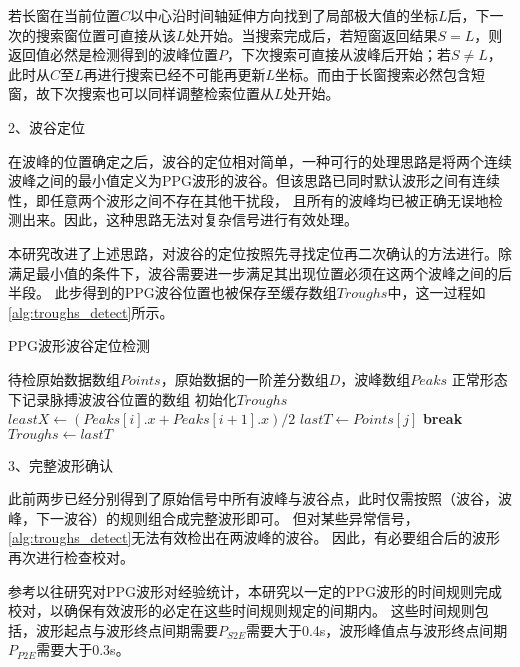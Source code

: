 若长窗在当前位置$C$以中心沿时间轴延伸方向找到了局部极大值的坐标$L$后，下一次的搜索窗位置可直接从该$L$处开始。当搜索完成后，若短窗返回结果$S=L$，则返回值必然是检测得到的波峰位置$P$，下次搜索可直接从波峰后开始；若$S\ne L$，
此时从$C$至$L$再进行搜索已经不可能再更新$L$坐标。而由于长窗搜索必然包含短窗，故下次搜索也可以同样调整检索位置从$L$处开始。

2、波谷定位

在波峰的位置确定之后，波谷的定位相对简单，一种可行的处理思路是将两个连续波峰之间的最小值定义为PPG波形的波谷。但该思路已同时默认波形之间有连续性，即任意两个波形之间不存在其他干扰段，
且所有的波峰均已被正确无误地检测出来。因此，这种思路无法对复杂信号进行有效处理。

本研究改进了上述思路，对波谷的定位按照先寻找定位再二次确认的方法进行。除满足最小值的条件下，波谷需要进一步满足其出现位置必须在这两个波峰之间的后半段。
此步得到的PPG波谷位置也被保存至缓存数组$Troughs$中，这一过程如\autoref{alg:troughs_detect}所示。
\begin{breakablealgorithm}
    \caption{PPG波形波谷定位检测}
    \label{alg:troughs_detect}
    \begin{algorithmic}[1] %
        \Require 待检原始数据数组$Points$，原始数据的一阶差分数组$D$，波峰数组$Peaks$
        \Ensure 正常形态下记录脉搏波波谷位置的数组
            \State 初始化$Troughs$
                \State $leastX \gets (Peaks[i].x + Peaks[i+1].x )/2$
                            \State $lastT \gets Points[j]$
                            \State \textbf{break}
                        \EndIf
                    \EndFor
                \State $Troughs \gets lastT$
            \EndFor
            \State {}
        \EndFunction
    \end{algorithmic}
\end{breakablealgorithm}

3、完整波形确认

此前两步已经分别得到了原始信号中所有波峰与波谷点，此时仅需按照（波谷，波峰，下一波谷）的规则组合成完整波形即可。
但对某些异常信号，\autoref{alg:troughs_detect}无法有效检出在两波峰的波谷。
因此，有必要组合后的波形再次进行检查校对。

参考以往研究对PPG波形对经验统计，本研究以一定的PPG波形的时间规则完成校对，以确保有效波形的必定在这些时间规则规定的间期内。
这些时间规则包括，波形起点与波形终点间期需要$P_{S2E}$需要大于0.4s，波形峰值点与波形终点间期$P_{P2E}$需要大于0.3s。

